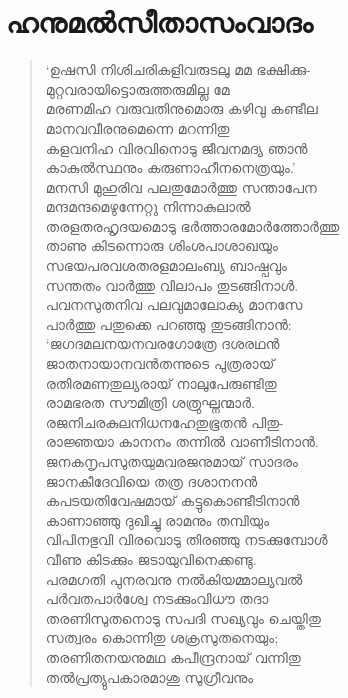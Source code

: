 \section{ഹനുമല്‍സീതാസംവാദം}

\begin{verse}
‘ഉഷസി നിശിചരികളിവരുടലു മമ ഭക്ഷിക്കു-\\
മുറ്റവരായിട്ടൊരുത്തരുമില്ല മേ\\
മരണമിഹ വരുവതിനുമൊരു കഴിവു കണ്ടീല\\
മാനവവീരനുമെന്നെ മറന്നിതു\\
കളവനിഹ വിരവിനൊടു ജീവനമദ്യ ഞാന്‍\\
കാകുല്‍സ്ഥനും കരുണാഹീനനെത്രയും.’\\
മനസി മുഹുരിവ പലതുമോര്‍ത്തു സന്താപേന\\
മന്ദമന്ദമെഴുന്നേറ്റു നിന്നാകുലാല്‍\\
തരളതരഹൃദയമൊടു ഭര്‍ത്താരമോര്‍ത്തോര്‍ത്തു\\
താണു കിടന്നൊരു ശിംശപാശാഖയും\\
സഭയപരവശതരളമാലംബ്യ ബാഷ്പവും\\
സന്തതം വാര്‍ത്തു വിലാപം തുടങ്ങിനാള്‍.\\
പവനസുതനിവ പലവുമാലോക്യ മാനസേ\\
പാര്‍ത്തു പതുക്കെ പറഞ്ഞു തുടങ്ങിനാന്‍:\\
‘ജഗദമലനയനവരഗോത്രേ ദശരഥന്‍\\
ജാതനായാനവന്‍തന്നുടെ പുത്രരായ്\\
രതിരമണതുല്യരായ് നാലുപേരുണ്ടിതു\\
രാമഭരത സൗമിത്രി ശത്രുഘ്നന്മാര്‍.\\
രജനിചരകുലനിധനഹേതുഭൂതന്‍ പിതു-\\
രാജ്ഞയാ കാനനം തന്നില്‍ വാണീടിനാന്‍.\\
ജനകനൃപസുതയുമവരജനുമായ് സാദരം\\
ജാനകീദേവിയെ തത്ര ദശാനനന്‍\\
കപടയതിവേഷമായ് കട്ടുകൊണ്ടീടിനാന്‍\\
കാണാഞ്ഞു ദുഖിച്ചു രാമനും തമ്പിയും\\
വിപിനഭുവി വിരവൊടു തിരഞ്ഞു നടക്കുമ്പോള്‍\\
വീണു കിടക്കും ജടായുവിനെക്കണ്ടു.\\
പരമഗതി പുനരവനു നല്‍കിയമ്മാല്യവല്‍\\
പര്‍വതപാര്‍ശ്വേ നടക്കുംവിധൗ തദാ\\
തരണിസുതനൊടു സപദി സഖ്യവും ചെയ്തിതു\\
സത്വരം കൊന്നിതു ശക്രസുതനെയും;\\
തരണിതനയനുമഥ കപീന്ദ്രനായ് വന്നിതു\\
തല്‍പ്രത്യുപകാരമാശു സുഗ്രീവനും\\

\end{verse}

